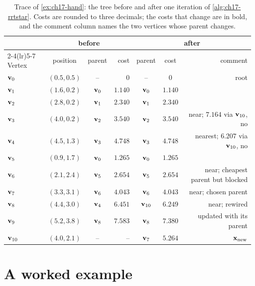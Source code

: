 \begin{table}[tb]
  \centering\small
  \caption{Trace of \cref{ex:ch17-hand}: the tree before and after one
  iteration of \cref{alg:ch17-rrtstar}. Costs are rounded to three
  decimals; the costs that change are in bold, and the comment column
  names the two vertices whose parent changes.}
  \label{tab:ch17-hand}
  \begin{tabular}{@{}lccrccr@{}}
  \toprule
  & \multicolumn{3}{c}{before} & \multicolumn{3}{c}{after}\\
  \cmidrule(lr){2-4}\cmidrule(lr){5-7}
  Vertex & position & parent & cost & parent & cost & comment\\
  \midrule
  $\mathbf{v}_0$ & $(0.5,0.5)$ & -- & $0$ & -- & $0$ & root\\
  $\mathbf{v}_1$ & $(1.6,0.2)$ & $\mathbf{v}_0$ & $1.140$ & $\mathbf{v}_0$ & $1.140$ & \\
  $\mathbf{v}_2$ & $(2.8,0.2)$ & $\mathbf{v}_1$ & $2.340$ & $\mathbf{v}_1$ & $2.340$ & \\
  $\mathbf{v}_3$ & $(4.0,0.2)$ & $\mathbf{v}_2$ & $3.540$ & $\mathbf{v}_2$ & $3.540$ & near; $7.164$ via $\mathbf{v}_{10}$, no\\
  $\mathbf{v}_4$ & $(4.5,1.3)$ & $\mathbf{v}_3$ & $4.748$ & $\mathbf{v}_3$ & $4.748$ & nearest; $6.207$ via $\mathbf{v}_{10}$, no\\
  $\mathbf{v}_5$ & $(0.9,1.7)$ & $\mathbf{v}_0$ & $1.265$ & $\mathbf{v}_0$ & $1.265$ & \\
  $\mathbf{v}_6$ & $(2.1,2.4)$ & $\mathbf{v}_5$ & $2.654$ & $\mathbf{v}_5$ & $2.654$ & near; cheapest parent but blocked\\
  $\mathbf{v}_7$ & $(3.3,3.1)$ & $\mathbf{v}_6$ & $4.043$ & $\mathbf{v}_6$ & $4.043$ & near; chosen parent\\
  $\mathbf{v}_8$ & $(4.4,3.0)$ & $\mathbf{v}_4$ & $6.451$ & $\mathbf{v}_{10}$ & $\mathbf{6.249}$ & near; rewired\\
  $\mathbf{v}_9$ & $(5.2,3.8)$ & $\mathbf{v}_8$ & $7.583$ & $\mathbf{v}_8$ & $\mathbf{7.380}$ & updated with its parent\\
  $\mathbf{v}_{10}$ & $(4.0,2.1)$ & -- & -- & $\mathbf{v}_7$ & $\mathbf{5.264}$ & $\mathbf{x}_{\mathrm{new}}$\\
  \bottomrule
  \end{tabular}
\end{table}

\section{A worked example}
\label{sec:ch17-example}

